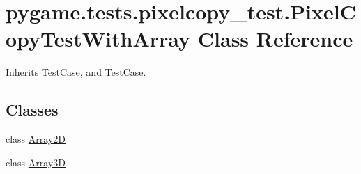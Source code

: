 \hypertarget{classpygame_1_1tests_1_1pixelcopy__test_1_1_pixel_copy_test_with_array}{}\section{pygame.\+tests.\+pixelcopy\+\_\+test.\+Pixel\+Copy\+Test\+With\+Array Class Reference}
\label{classpygame_1_1tests_1_1pixelcopy__test_1_1_pixel_copy_test_with_array}


Inherits Test\+Case, and Test\+Case.

\subsection*{Classes}
\begin{DoxyCompactItemize}
\item 
class \hyperlink{classpygame_1_1tests_1_1pixelcopy__test_1_1_pixel_copy_test_with_array_1_1_array2_d}{Array2D}
\item 
class \hyperlink{classpygame_1_1tests_1_1pixelcopy__test_1_1_pixel_copy_test_with_array_1_1_array3_d}{Array3D}
\end{DoxyCompactItemize}

